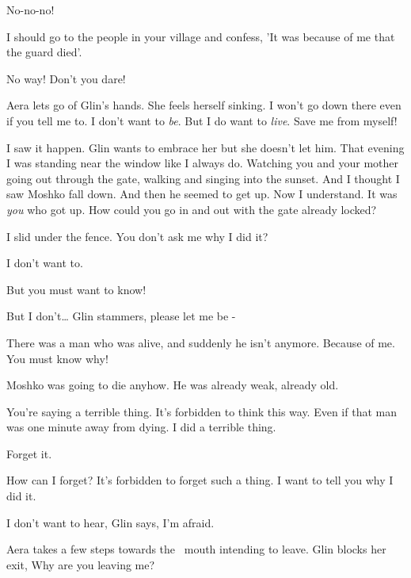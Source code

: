 \documentclass[12pt]{book}
\begin{document}
{\textquotedbl}No-no-no!{\textquotedbl}~

{\textquotedbl}I should go to the people in your village and confess, 'It was because of me that the guard
died'.{\textquotedbl}

{\textquotedbl}No way! Don't you dare!{\textquotedbl} ~~~~~~~~~~~~~~~~~~~~~~~~~~~~~~~~~~~~~~~~~~~~

Aera lets go of Glin's hands. She feels herself sinking. {\textquotedbl}I won't go down there even if you tell me to. I
don't want to \textit{be}. But I do want to \textit{live}. Save me from myself!{\textquotedbl}

{\textquotedbl}I saw it happen.{\textquotedbl} Glin wants to embrace her but she doesn't let him. {\textquotedbl}That
evening I was standing near the window like I always do. Watching you and your mother going out through the gate,
walking and singing into the sunset. And I thought I saw Moshko fall down. And then he seemed to get up. Now I
understand. It was \textit{you} who got up. How could you go in and out with the gate already locked?{\textquotedbl}

{\textquotedbl}I slid under the fence. You don't ask me why I did it?{\textquotedbl}

{\textquotedbl}I don't want to.{\textquotedbl}

{\textquotedbl}But you must want to know!{\textquotedbl}

{\textquotedbl}But I don't{\dots}{\textquotedbl} Glin stammers, {\textquotedbl}please let me be -{\textquotedbl}

{\textquotedbl}There was a man who was alive, and suddenly he isn't anymore. Because of me. You must know
why!{\textquotedbl}

{\textquotedbl}Moshko was going to die anyhow. He was already weak, already old.{\textquotedbl}

{\textquotedbl}You're saying a terrible thing. It's forbidden to think this way. Even if that man was one minute away
from dying. I did a terrible thing.{\textquotedbl}

{\textquotedbl}Forget it.{\textquotedbl}

{\textquotedbl}How can I forget? It's forbidden to forget such a thing. I want to tell you why I did it.{\textquotedbl}

{\textquotedbl}I don't want to hear,{\textquotedbl} Glin says, {\textquotedbl}I'm afraid.{\textquotedbl}

Aera takes a few steps towards the \ mouth{ }intending to leave. Glin blocks her exit, {\textquotedbl}Why
are you leaving me?{\textquotedbl}
\end{document}
